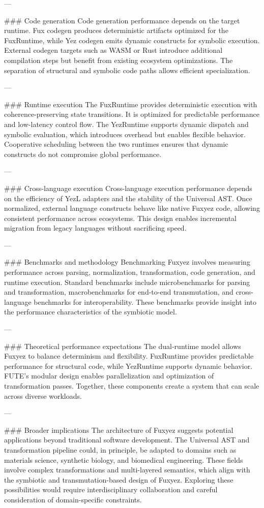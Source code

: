 \documentclass[12pt, a4paper]{book}
\begin{document}
---

\#\#\# Code generation  
Code generation performance depends on the target runtime. Fux codegen produces deterministic artifacts optimized for the FuxRuntime, while Yez codegen emits dynamic constructs for symbolic execution. External codegen targets such as WASM or Rust introduce additional compilation steps but benefit from existing ecosystem optimizations. The separation of structural and symbolic code paths allows efficient specialization.

---

\#\#\# Runtime execution  
The FuxRuntime provides deterministic execution with coherence-preserving state transitions. It is optimized for predictable performance and low-latency control flow. The YezRuntime supports dynamic dispatch and symbolic evaluation, which introduces overhead but enables flexible behavior. Cooperative scheduling between the two runtimes ensures that dynamic constructs do not compromise global performance.

---

\#\#\# Cross-language execution  
Cross-language execution performance depends on the efficiency of YezL adapters and the stability of the Universal AST. Once normalized, external language constructs behave like native Fuxyez code, allowing consistent performance across ecosystems. This design enables incremental migration from legacy languages without sacrificing speed.

---

\#\#\# Benchmarks and methodology  
Benchmarking Fuxyez involves measuring performance across parsing, normalization, transformation, code generation, and runtime execution. Standard benchmarks include microbenchmarks for parsing and transformation, macrobenchmarks for end-to-end transmutation, and cross-language benchmarks for interoperability. These benchmarks provide insight into the performance characteristics of the symbiotic model.

---

\#\#\# Theoretical performance expectations  
The dual‑runtime model allows Fuxyez to balance determinism and flexibility. FuxRuntime provides predictable performance for structural code, while YezRuntime supports dynamic behavior. FUTE’s modular design enables parallelization and optimization of transformation passes. Together, these components create a system that can scale across diverse workloads.

---

\#\#\# Broader implications  
The architecture of Fuxyez suggests potential applications beyond traditional software development. The Universal AST and transformation pipeline could, in principle, be adapted to domains such as materials science, synthetic biology, and biomedical engineering. These fields involve complex transformations and multi-layered semantics, which align with the symbiotic and transmutation-based design of Fuxyez. Exploring these possibilities would require interdisciplinary collaboration and careful consideration of domain-specific constraints.
    
\end{document}

